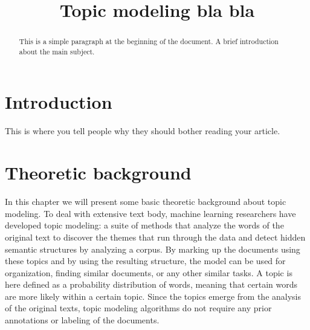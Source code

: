 \documentclass[12pt]{report}
\title{Topic modeling bla bla}
\begin{document}
\maketitle
\tableofcontents


\begin{abstract}
This is a simple paragraph at the beginning of the 
document. A brief introduction about the main subject.
\end{abstract}


\section{Introduction}
This is where you tell people why they should bother reading your article.
\vspace{10mm}

\section{Theoretic background}

\vspace{5mm}

In this chapter we will present some basic theoretic background about topic modeling. To deal with extensive text body, machine learning researchers have developed topic modeling: a suite of methods that analyze the words of the original text to discover the themes that run through the data and detect hidden semantic structures by analyzing a corpus. By marking up the documents using these topics and by using the resulting structure, the model can be used for organization, finding similar documents, or any other similar tasks. A topic is here defined as a probability distribution of words, meaning that certain words are more likely within a certain topic. Since the topics emerge from the analysis of the original texts, topic modeling algorithms do not require any prior annotations or labeling of the documents.\par

\vspace{3mm}
\end{document}
